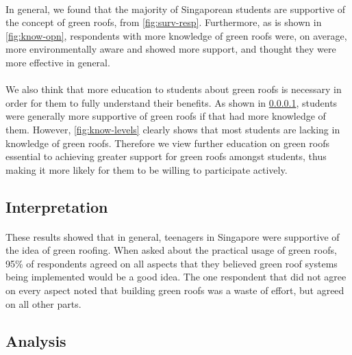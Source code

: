 \documentclass{article}
\begin{document}
\begin{multicols}{2}
  \paragraph{} \label{par:support} In general, we found that the
  majority of Singaporean students are supportive of the concept of
  green roofs, from \cref{fig:surv-resp}. Furthermore, as is shown in
  \cref{fig:know-opn}, respondents with more knowledge of green roofs
  were, on average, more environmentally aware and showed more support,
  and thought they were more effective in general.

  \paragraph{} We also think that more education to students about
  green roofs is necessary in order for them to fully understand their
  benefits. As shown in \cref{par:support}, students were generally more
  supportive of green roofs if that had more knowledge of them. However,
  \cref{fig:know-levels} clearly shows that most students are lacking in
  knowledge of green roofs. Therefore we view further education on
  green roofs essential to achieving greater support for green roofs
  amongst students, thus making it more likely for them to be willing
  to participate actively.


  \subsection{Interpretation}
  \paragraph{} These results showed that in general, teenagers in
  Singapore were supportive of the idea of green roofing. When asked about
  the practical usage of green roofs, 95\% of respondents agreed on all
  aspects that they believed green roof systems being implemented would
  be a good idea. The one respondent that did not agree on every aspect
  noted that building green roofs was a waste of effort, but agreed on
  all other parts.

  \subsection{Analysis}

\end{multicols}
\end{document}
